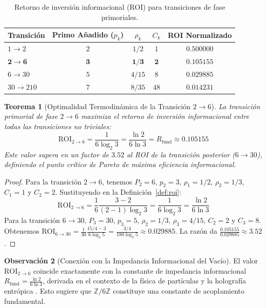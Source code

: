 \documentclass{article}
\numberwithin{equation}{section}
\theoremstyle{plain}
\newtheorem{theorem}{Teorema}[section]
\theoremstyle{definition}
\newtheorem{remark}[theorem]{Observación}
\begin{document}
\begin{table}[htbp]
\centering
\caption{Retorno de inversión informacional (ROI) para transiciones de fase primoriales.}
\label{tab:roi}
\begin{tabular}{lcccc}
\toprule
\textbf{Transición} & \textbf{Primo Añadido ($p_k$)} & $\rho_k$ & $C_k$ & \textbf{ROI Normalizado} \\
\midrule
$1 \to 2$   & $2$ & $1/2$  & $1$  & $0.500000$ \\
$\mathbf{2 \to 6}$   & $\mathbf{3}$ & $\mathbf{1/3}$  & $\mathbf{2}$  & $\mathbf{0.105155}$ \\
$6 \to 30$  & $5$ & $4/15$ & $8$  & $0.029885$ \\
$30 \to 210$ & $7$ & $8/35$ & $48$ & $0.014231$ \\
\bottomrule
\end{tabular}
\end{table}

\begin{theorem}[Optimalidad Termodinámica de la Transición $2 \to 6$]
\label{thm:optimalidad-termodinamica}
La transición primorial de fase $2 \to 6$ maximiza el retorno de inversión informacional entre todas las transiciones no triviales:
\begin{equation}
\mathrm{ROI}_{2 \to 6} = \frac{1}{6 \log_2 3} = \frac{\ln 2}{6 \ln 3} = R_{\text{fund}} \approx 0.105155
\end{equation}
Este valor supera en un factor de $3.52$ al ROI de la transición posterior ($6 \to 30$), definiendo el punto crítico de Pareto de máxima eficiencia informacional.
\end{theorem}

\begin{proof}
Para la transición $2 \to 6$, tenemos $P_2 = 6$, $p_2 = 3$, $\rho_1 = 1/2$, $\rho_2 = 1/3$, $C_1 = 1$ y $C_2 = 2$. Sustituyendo en la Definición~\ref{def:roi}:
\begin{equation}
\mathrm{ROI}_{2 \to 6} = \frac{1}{6} \frac{3 - 2}{(2 - 1) \log_2 3} = \frac{1}{6 \log_2 3} = \frac{\ln 2}{6 \ln 3}
\end{equation}
Para la transición $6 \to 30$, $P_3 = 30$, $p_3 = 5$, $\rho_2 = 1/3$, $\rho_3 = 4/15$, $C_2 = 2$ y $C_3 = 8$. Obtenemos $\mathrm{ROI}_{6 \to 30} = \frac{1}{30} \frac{15/4 - 3}{6 \log_2 5} = \frac{3/4}{180 \log_2 5} \approx 0.029885$. La razón da $\frac{0.105155}{0.029885} \approx 3.52$.
\end{proof}

\begin{remark}[Conexión con la Impedancia Informacional del Vacío]
\label{rem:rfund-identity}
El valor $\mathrm{ROI}_{2 \to 6}$ coincide exactamente con la constante de impedancia informacional $R_{\text{fund}} = \frac{\ln 2}{6 \ln 3}$, derivada en el contexto de la física de partículas y la holografía entrópica \cite{Peinador2026RiemannGUE}. Esto sugiere que $\mathbb{Z}/6\mathbb{Z}$ constituye una constante de acoplamiento fundamental.
\end{remark}
\end{document}
